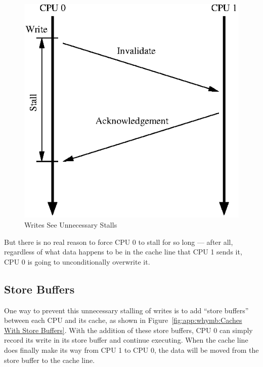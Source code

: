 \begin{figure}[htb]
\begin{center}
\includegraphics{appendix/whymb/cacheSCwrite}
\end{center}
\caption{Writes See Unnecessary Stalls}
\label{fig:app:whymb:Writes See Unnecessary Stalls}
\end{figure}

But there is no real reason to force CPU 0 to stall for so long --- after
all, regardless of what data happens to be in the cache line that CPU 1
sends it, CPU 0 is going to unconditionally overwrite it.

\subsection{Store Buffers}
\label{sec:app:whymb:Store Buffers}

One way to prevent this unnecessary stalling of writes is to add
``store buffers'' between each CPU and its cache, as shown in
Figure~\ref{fig:app:whymb:Caches With Store Buffers}.
With the addition of these store buffers, CPU 0 can simply record
its write in its store buffer and continue executing.
When the cache line does finally make its way from CPU 1 to CPU 0,
the data will be moved from the store buffer to the cache line.

